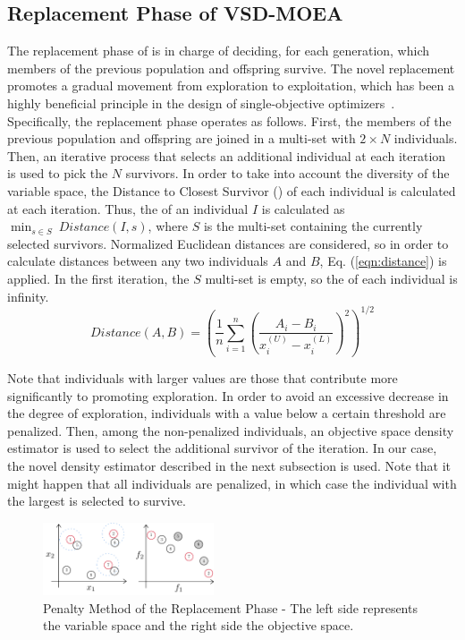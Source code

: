 \subsection{Replacement Phase of VSD-MOEA}

The replacement phase of \EAS{} is in charge of deciding, for each generation, which members of the previous population and offspring survive.
%
The novel replacement promotes a gradual movement from exploration to exploitation, which has been a highly 
beneficial principle in the design of single-objective optimizers~\cite{Joel:MULTI_DYNAMIC}.
%
Specifically, the replacement phase operates as follows.
%
First, the members of the previous population and offspring are joined in a multi-set with $2 \times N$ individuals.
%
Then, an iterative process that selects an additional
individual at each iteration is used to pick the $N$ survivors. 
%
In order to take into account the diversity of the variable space, the Distance to Closest Survivor (\DCS{}) of each
individual is calculated at each iteration.
%
Thus, the \DCS{} of an individual $I$ is calculated as $\displaystyle{\min_{s \in S}\ Distance(I, s)}$,
where $S$ is the multi-set containing the currently selected survivors. 
%
Normalized Euclidean distances are considered, so in order to calculate distances between any two individuals $A$ and $B$, 
Eq. (\ref{eqn:distance}) is applied.
%
In the first iteration, the $S$ multi-set is empty, so the \DCS{} of each individual is infinity.
%
\begin{equation}\label{eqn:distance}
Distance(A, B) =   \left ( \frac{1}{n}  \sum_{i=1}^n \left ( \frac{A_i - B_i}{x_i^{(U)} - x_i^{(L)}} \right )^2  \right)^{1/2}
\end{equation}

Note that individuals with larger \DCS{} values are those that contribute more significantly to promoting exploration.
%
In order to avoid an excessive decrease in the degree of exploration, individuals with a \DCS{} value below a certain threshold are penalized.
%
Then, among the non-penalized individuals, an objective space density estimator is used to select the additional
survivor of the iteration.
%
In our case, the novel density estimator described in the next subsection is used. 
%
Note that it might happen that all individuals are penalized, in which case the individual with the largest \DCS{} is selected to survive.

\begin{figure}[t]
\centering
\includegraphics[width=0.45\textwidth]{Images/Diagram.pdf}
\caption{Penalty Method of the Replacement Phase - The left side represents the variable space and the right side the 
objective space.} \label{fig:Hypersphere}
\end{figure}



